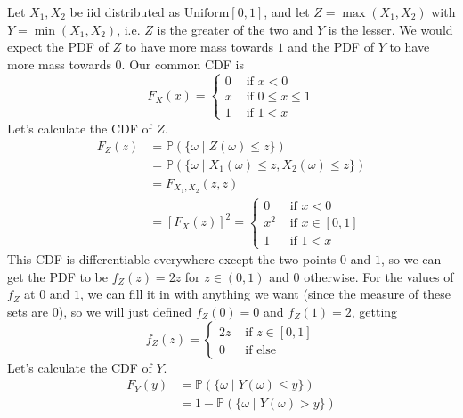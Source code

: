     \begin{example}[Uniforms]
      Let $X_1, X_2$ be iid distributed as $\mathrm{Uniform}[0, 1]$, and let $Z = \max(X_1, X_2)$ with $Y = \min(X_1, X_2)$, i.e. $Z$ is the greater of the two and $Y$ is the lesser. We would expect the PDF of $Z$ to have more mass towards $1$ and the PDF of $Y$ to have more mass towards $0$. Our common CDF is 
      \begin{equation}
        F_{X} (x) = \begin{cases} 0 & \text{ if } x < 0 \\
        x & \text{ if } 0 \leq x \leq 1 \\
        1 & \text{ if } 1 < x \end{cases}
      \end{equation}
      Let's calculate the CDF of $Z$. 
      \begin{align*}
        F_{Z} (z) & = \mathbb{P}(\{\omega \mid Z(\omega) \leq z\}) \\
        & = \mathbb{P}(\{ \omega \mid X_1 (\omega) \leq z, X_2 (\omega) \leq z\}) \\
        & = F_{X_1, X_2} (z, z) \\
        & = [F_{X} (z)]^2 = \begin{cases} 0 & \text{ if } x < 0 \\
        x^2 & \text{ if } x \in [0, 1] \\
        1 & \text{ if } 1 < x \end{cases}
      \end{align*}
      This CDF is differentiable everywhere except the two points $0$ and $1$, so we can get the PDF to be $f_Z (z) = 2 z$ for $z \in (0, 1)$ and $0$ otherwise. For the values of $f_Z$ at $0$ and $1$, we can fill it in with anything we want (since the measure of these sets are $0$), so we will just defined $f_Z (0) = 0$ and $f_Z(1) = 2$, getting 
      \begin{equation}
        f_Z (z) = \begin{cases} 2 z & \text{ if } z \in [0, 1] \\
        0 & \text{ if else} \end{cases}
      \end{equation}
      Let's calculate the CDF of $Y$. 
      \begin{align*}
        F_{Y} (y) & = \mathbb{P}(\{ \omega \mid Y(\omega) \leq y\}) \\
        & = 1 - \mathbb{P}(\{ \omega \mid Y(\omega) > y\}) \\

\end{align*}
\end{example}
